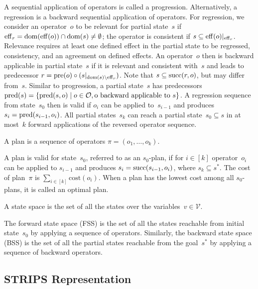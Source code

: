 A sequential application of operators is called a progression. Alternatively, a regression is a backward sequential application of operators. For regression, we consider an operator~$o$ to be relevant for partial state~$s$ if $\operatorname{eff}_r=\operatorname{dom}(\operatorname{eff}(o))\cap\operatorname{dom}(s)\neq\emptyset$; the operator is consistent if $s \subseteq \operatorname{eff}(o)|_{\operatorname{eff}_r}$. Relevance requires at least one defined effect in the partial state to be regressed, consistency, and an agreement on defined effects. An operator~$o$ then is backward applicable in partial state~$s$ if it is relevant and consistent with~$s$ and leads to predecessor $r=\operatorname{pre}(o)\circ (s|_{\operatorname{dom}(s)\setminus\operatorname{eff}_r})$. Note that $s \subseteq \operatorname{succ}(r,o)$, but may differ from~$s$. Similar to progression, a partial state~$s$ has predecessors $\operatorname{pred}(s)=\{\operatorname{pred}(s,o)\mid o\in \mathcal{O}, \text{o backward applicable to }s\}$. A regression sequence from state~$s_0$ then is valid if $o_i$ can be applied to~$s_{i-1}$ and produces~$s_i=\operatorname{pred}(s_{i-1},o_i)$. All partial states~$s_k$ can reach a partial state~$s_0 \subseteq s$ in at most~$k$ forward applications of the reversed operator sequence.

\begin{definition}[Plan]
    \label{def:plan}
    A plan is a sequence of operators $\pi=(o_1,\ldots,o_k)$.
\end{definition}

A plan is valid for state~$s_0$, referred to as an $s_0$-plan, if for $i\in[k]$ operator~$o_i$ can be applied to $s_{i-1}$ and produces $s_i=\operatorname{succ}(s_{i-1},o_i)$, where $s_k \subseteq s^*$. The cost of plan~$\pi$ is $\sum_{i\in[k]} \text{cost}(o_i)$. When a plan has the lowest cost among all $s_0$-plans, it is called an optimal plan.

\begin{definition}
    \label{def:statespace}
    A state space is the set of all the states over the variables~$v \in \mathcal{V}$.
\end{definition}

The forward state space (FSS) is the set of all the states reachable from initial state~$s_0$ by applying a sequence of operators. Similarly, the backward state space (BSS) is the set of all the partial states reachable from the goal~$s^*$ by applying a sequence of backward operators.

\subsection{STRIPS Representation}
\label{sec:strips}

